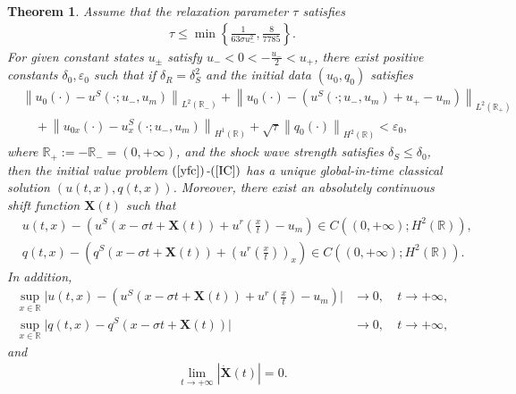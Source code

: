 \documentclass[10pt,reqno]{amsart}
\numberwithin{equation}{section}
\newtheorem{theorem}{Theorem}[section]
\begin{document}
	\begin{theorem}\label{theo1}
		Assume that the relaxation parameter $\tau$ satisfies
		\begin{align}\label{tau}
			\tau\leq\min\left\{\frac{1}{63\sigma u_{-}^2},\frac{8}{7785}\right\}.
		\end{align}
		For given constant states $u_{\pm}$ satisfy $u_{-}<0<-\frac{u_{-}}{2}<u_{+}$, there  exist positive constants $\delta_{0}, \varepsilon_{0}$ such that if $\delta_{R}=\delta_{S}^2$ and the initial data $(u_0,q_0)$ satisfies
		\begin{equation}\label{C1}
			\begin{aligned}
				& \left\|u_0(\cdot)-u^S\left(\cdot ; u_{-}, u_m\right)\right\|_{L^2\left(\mathbb{R}_{-}\right)}+\left\|u_0(\cdot)-\left(u^S\left(\cdot ; u_{-}, u_m\right)+u_{+}-u_m\right)\right\|_{L^2\left(\mathbb{R}_{+}\right)} \\
				& \quad+\left\|u_{0 x}(\cdot)-u_x^S\left(\cdot ; u_{-}, u_m\right)\right\|_{H^1(\mathbb{R})}+\sqrt{\tau}\left\|q_{0}(\cdot)\right\|_{H^2(\mathbb{R})}<\varepsilon_0,
			\end{aligned}
		\end{equation}
		where $\mathbb{R}_{+}:=-\mathbb{R}_{-}=(0,+\infty)$, and the shock wave strength satisfies $\delta_S\leq\delta_{0}$, then the initial value problem $(\ref{yfc})$-$(\ref{IC})$ has a unique global-in-time classical solution $(u(t,x),q(t,x))$. Moreover, there exist an absolutely continuous shift function $\mathbf{X}(t)$ such that
		\begin{equation}
			\begin{aligned}
				&u(t, x)-\left(u^S\left(x-\sigma t+\mathbf{X}(t)\right)+u^r\left(\frac{x}{t}\right)-u_m\right) \in C\left(\left(0,+\infty\right) ; H^2(\mathbb{R})\right),\\
				&q(t,x)-\left(q^{S}(x-\sigma t+\mathbf{X}(t))+\left(u^{r}\left(\frac{x}{t}\right)\right)_{x}\right) \in C\left(\left(0,+\infty\right); H^2(\mathbb{R})\right).
			\end{aligned}
		\end{equation}
		In addition,
		\begin{equation}\label{time}
			\begin{aligned}
				\sup _{x \in \mathbb{R}}\bigg|u(t, x)-\left(u^{S}\left(x-\sigma t+\mathbf{X}(t)\right)+u^{r}\left(\frac{x}{t}\right)-u_{m}\right)\bigg|&\to0,\ &t \rightarrow+\infty,\\
				 \sup _{x \in \mathbb{R}}\bigg|q(t,x)-q^{S}(x-\sigma t+\mathbf{X}(t))\bigg|&\to0,\ &t \rightarrow+\infty,
			\end{aligned} 
		\end{equation}
		and
		\begin{align}\label{X(t)}
			\lim _{t \rightarrow+\infty}\left|\dot{\mathbf{X}}(t)\right|=0.
		\end{align}
	\end{theorem}
\end{document}
